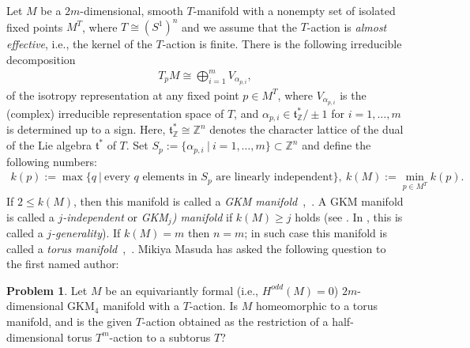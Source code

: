 \documentclass{amsart}
\theoremstyle{definition}
\newcounter{thmMaincounter}
\newtheorem{probM}[thmMaincounter]{Problem}
\theoremstyle{remark}
\numberwithin{equation}{section}
\newcommand{\Z}{{\mathbb{Z}}}
\begin{document}
Let $M$ be a $2m$-dimensional, smooth $T$-manifold with a nonempty set of isolated fixed points $M^{T}$, where $T\cong (S^{1})^{n}$ and we assume that the $T$-action is {\it almost effective}, i.e., the kernel of the $T$-action is finite.
There is the following irreducible decomposition 
\begin{align}
\label{cpx_on_p}
T_{p}M\cong \bigoplus_{i=1}^{m}V_{\alpha_{p,i}},
\end{align}
of the isotropy representation at any fixed point $p\in M^{T}$, where $V_{\alpha_{p,i}}$ is the (complex) irreducible representation space of $T$, and $\alpha_{p,i}\in \mathfrak{t}_{\mathbb{Z}}^{*}/\pm 1$ for $i=1,\ldots, m$ is determined up to a sign.
Here, $\mathfrak{t}_{\mathbb{Z}}^{*}\cong \Z^{n}$ denotes the character lattice of 
the dual of the Lie algebra $\mathfrak{t}^{*}$ of $T$.
Set $S_{p}:=\{\alpha_{p,i}\ |\ i=1,\ldots, m\}\subset \mathbb{Z}^{n}$ and define the following numbers:
\begin{align}
\label{independency}
k(p):=\max\{q\ |\ \text{every $q$ elements in $S_{p}$ are linearly independent}\},\ 
k(M):=\min\limits_{p\in M^{T}} k(p).
\end{align}
If $2\le k(M)$, then this manifold is called a \textit{GKM manifold}~\cite{GKM},~\cite{GZ}. 
A GKM manifold is called a \textit{$j$-independent} or \textit{GKM$_{j}$) manifold} if $k(M)\geq j$ holds (see \cite{AMS, GS}. In \cite{AM}, this is called a {\it $j$-generality}). 
If $k(M)=m$ then $n=m$; in such case this manifold is called a {\it torus manifold}~\cite{MP},~\cite{HaMa}.  
Mikiya Masuda has asked the following question to the first named author: 
\begin{probM}
\label{Masuda-problem}
Let $M$ be an equivariantly formal (i.e., $H^{odd}(M)=0$) $2m$-dimensional GKM$_4$ manifold with a $T$-action.
Is $M$ homeomorphic to a torus manifold, and is the given $T$-action obtained as the restriction of a half-dimensional torus $T^{m}$-action to a subtorus $T$?
\end{probM}
\end{document}
